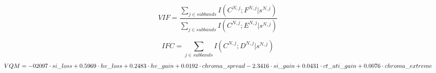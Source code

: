 \begin{equation}
VIF = \frac{\sum_{j\in subbands}{I(C^{N,j}; F^{N,j}|s^{N,j})}}{\sum_{j\in subbands}{I(C^{N,j}; E^{N,j}|s^{N,j})}}
\end{equation}

\begin{equation}
IFC = \sum_{j\in subbands}{I(C^{N,j}; D^{N,j}|s^{N,j})}
\end{equation}
\begin{equation}
VQM = -02097\cdot si\_loss\\
+0.5969\cdot hv\_loss+0.2483\cdot hv\_gain\\ 
+0.0192\cdot chroma\_spread\\
-2.3416\cdot si\_gain\\
+0.0431\cdot ct\_ati\_gain\\
+0.0076\cdot chroma\_extreme
\end{equation}
